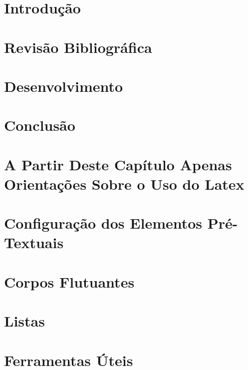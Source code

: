 \documentclass[english]{packages/icmc}
\begin{document}
\textual

\chapter{Introdução}
\label{chapter:introducao}


\chapter{Revisão Bibliográfica}
\label{chapter:bibliografia}


\chapter{Desenvolvimento}
\label{chapter:desenvolvimento}


\chapter{Conclusão}
\label{chapter:conclusao}


\chapter{A Partir Deste Capítulo Apenas Orientações Sobre o Uso do Latex}
\label{chapter:orientacoes-gerais}


\chapter{Configuração dos Elementos Pré-Textuais}
\label{chapter:config-pre-textual}


\chapter{Corpos Flutuantes}
\label{chapter:corpos-flutuantes}


\chapter{Listas}
\label{chapter:listas}


\chapter{Ferramentas Úteis}
\label{chapter:ferramentas-uteis}

\end{document}
